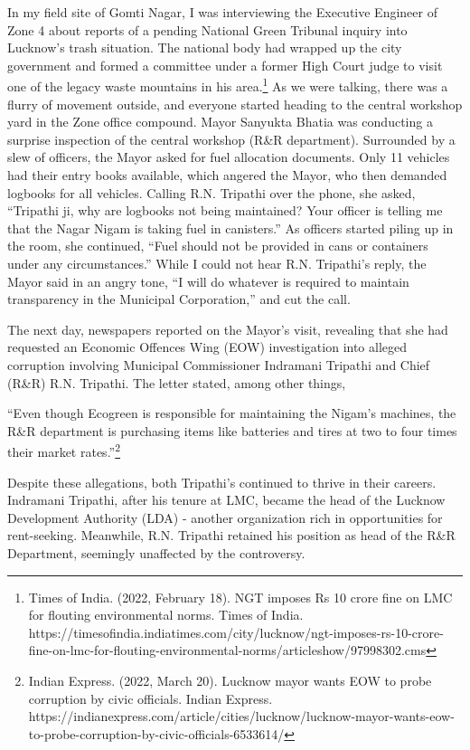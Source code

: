 In my field site of Gomti Nagar, I was interviewing the Executive Engineer of Zone 4 about reports of a pending National Green Tribunal inquiry into Lucknow's trash situation. The national body had wrapped up the city government and formed a committee under a former High Court judge to visit one of the legacy waste mountains in his area.\footnote{Times of India. (2022, February 18). NGT imposes Rs 10 crore fine on LMC for flouting environmental norms. Times of India. https://timesofindia.indiatimes.com/city/lucknow/ngt-imposes-rs-10-crore-fine-on-lmc-for-flouting-environmental-norms/articleshow/97998302.cms} As we were talking, there was a flurry of movement outside, and everyone started heading to the central workshop yard in the Zone office compound. Mayor Sanyukta Bhatia was conducting a surprise inspection of the central workshop (R\&R department). Surrounded by a slew of officers, the Mayor asked for fuel allocation documents. Only 11 vehicles had their entry books available, which angered the Mayor, who then demanded logbooks for all vehicles. Calling R.N. Tripathi over the phone, she asked, ``Tripathi ji, why are logbooks not being maintained? Your officer is telling me that the Nagar Nigam is taking fuel in canisters.'' As officers started piling up in the room, she continued, ``Fuel should not be provided in cans or containers under any circumstances.'' While I could not hear R.N. Tripathi's reply, the Mayor said in an angry tone, ``I will do whatever is required to maintain transparency in the Municipal Corporation,'' and cut the call.

The next day, newspapers reported on the Mayor's visit, revealing that she had requested an Economic Offences Wing (EOW) investigation into alleged corruption involving Municipal Commissioner Indramani Tripathi and Chief (R\&R) R.N. Tripathi. The letter stated, among other things,

``Even though Ecogreen is responsible for maintaining the Nigam's machines, the R\&R department is purchasing items like batteries and tires at two to four times their market rates.''\footnote{Indian Express. (2022, March 20). Lucknow mayor wants EOW to probe corruption by civic officials. Indian Express. https://indianexpress.com/article/cities/lucknow/lucknow-mayor-wants-eow-to-probe-corruption-by-civic-officials-6533614/}

Despite these allegations, both Tripathi's continued to thrive in their careers. Indramani Tripathi, after his tenure at LMC, became the head of the Lucknow Development Authority (LDA) - another organization rich in opportunities for rent-seeking. Meanwhile, R.N. Tripathi retained his position as head of the R\&R Department, seemingly unaffected by the controversy.


